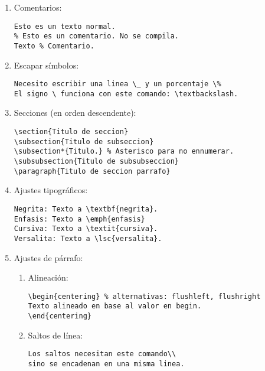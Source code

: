 \begin{enumerate}
\item Comentarios:
\lstset{style=latex}
\begin{lstlisting}
Esto es un texto normal.
% Esto es un comentario. No se compila.
Texto % Comentario.
\end{lstlisting}
\item Escapar símbolos:
\begin{lstlisting}
Necesito escribir una linea \_ y un porcentaje \%
El signo \ funciona con este comando: \textbackslash.
\end{lstlisting}
\item Secciones (en orden descendente):
\begin{lstlisting}
\section{Titulo de seccion}
\subsection{Titulo de subseccion}
\subsection*{Titulo.} % Asterisco para no ennumerar.
\subsubsection{Titulo de subsubseccion}
\paragraph{Titulo de seccion parrafo}
\end{lstlisting}
\item Ajustes tipográficos:
\begin{lstlisting}
Negrita: Texto a \textbf{negrita}.
Enfasis: Texto a \emph{enfasis}
Cursiva: Texto a \textit{cursiva}.
Versalita: Texto a \lsc{versalita}.
\end{lstlisting}

\item Ajustes de párrafo:
	\begin{enumerate}
	\item Alineación:
	\begin{lstlisting}
\begin{centering} % alternativas: flushleft, flushright
Texto alineado en base al valor en begin.
\end{centering}
	\end{lstlisting}
	\item Saltos de línea:
	\begin{lstlisting}
Los saltos necesitan este comando\\
sino se encadenan en una misma linea.


\end{lstlisting}
\end{enumerate}
\end{enumerate}

